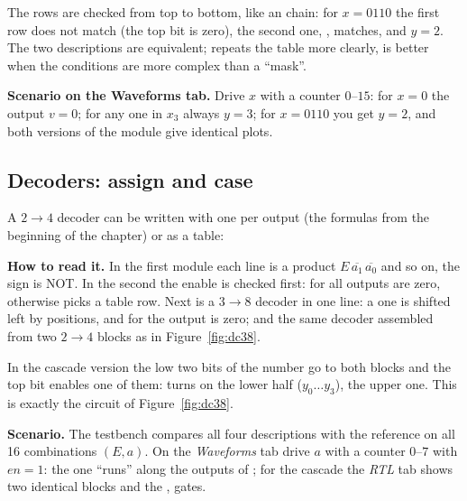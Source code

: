 The  rows are checked from top to bottom, like an 
chain: for $x=0110$ the first row does not match (the top bit is zero), the
second one, , matches, and $y=2$. The two descriptions are
equivalent;  repeats the table more clearly,  is better
when the conditions are more complex than a ``mask''.


\textbf{Scenario on the Waveforms tab.} Drive $x$ with a counter $0$--$15$:
for $x=0$ the output $v=0$; for any one in $x_3$ always $y=3$; for
$x=0110$ you get $y=2$, and both versions of the module give identical plots.

\subsection{Decoders: assign and case}

A $2\to4$ decoder can be written with one  per output
(the formulas from the beginning of the chapter) or as a  table:



\textbf{How to read it.} In the first module each line is a product
$E\,\overline{a_1}\,\overline{a_0}$ and so on, the sign \code{\textasciitilde} is NOT.
In the second the enable is checked first: for  all outputs are
zero, otherwise  picks a table row. Next is a $3\to8$ decoder
in one line: a one is shifted left by  positions, and for 
the output is zero; and the same decoder assembled from two $2\to4$ blocks as
in Figure~\ref{fig:dc38}.



In the cascade version the low two bits of the number go to both blocks and
the top bit enables one of them:  turns on the
lower half ($y_0\ldots y_3$),  the upper one. This is exactly
the circuit of Figure~\ref{fig:dc38}.

\textbf{Scenario.} The testbench  compares all four
descriptions with the reference on all 16 combinations $(E,a)$. On the
\emph{Waveforms} tab drive $a$ with a counter $0$--$7$ with $en=1$: the one
``runs'' along the outputs of ; for the cascade the \emph{RTL}
tab shows two identical blocks and the \code{\&}, \code{\textasciitilde} gates.

